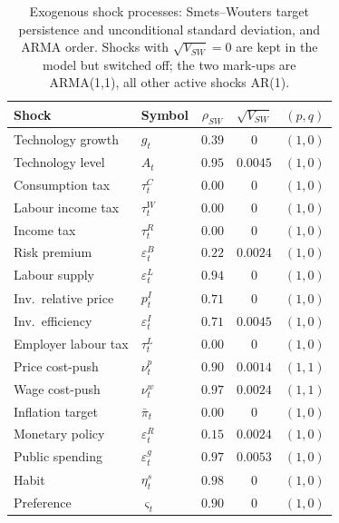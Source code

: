 \documentclass[11pt,a4paper]{article}
\newcommand{\bbar}[1]{\bar{#1}}
\begin{document}
\begin{table}[h]
\centering\small
\begin{tabular}{llccc}
\toprule
\textbf{Shock} & \textbf{Symbol} & $\rho_{SW}$ & $\sqrt{V_{SW}}$ & $(p,q)$ \\
\midrule
Technology growth    & $g_t$              & $0.39$ & $0$      & $(1,0)$ \\
Technology level     & $A_t$              & $0.95$ & $0.0045$ & $(1,0)$ \\
Consumption tax      & $\tau^C_t$         & $0.00$ & $0$      & $(1,0)$ \\
Labour income tax    & $\tau^W_t$         & $0.00$ & $0$      & $(1,0)$ \\
Income tax           & $\tau^R_t$         & $0.00$ & $0$      & $(1,0)$ \\
Risk premium         & $\varepsilon^B_t$  & $0.22$ & $0.0024$ & $(1,0)$ \\
Labour supply        & $\varepsilon^L_t$  & $0.94$ & $0$      & $(1,0)$ \\
Inv.\ relative price & $p^I_t$           & $0.71$ & $0$      & $(1,0)$ \\
Inv.\ efficiency     & $\varepsilon^I_t$  & $0.71$ & $0.0045$ & $(1,0)$ \\
Employer labour tax  & $\tau^L_t$         & $0.00$ & $0$      & $(1,0)$ \\
Price cost-push      & $\nu^p_t$          & $0.90$ & $0.0014$ & $(1,1)$ \\
Wage cost-push       & $\nu^w_t$          & $0.97$ & $0.0024$ & $(1,1)$ \\
Inflation target     & $\bbar\pi_t$       & $0.00$ & $0$      & $(1,0)$ \\
Monetary policy      & $\varepsilon^R_t$  & $0.15$ & $0.0024$ & $(1,0)$ \\
Public spending      & $\varepsilon^g_t$  & $0.97$ & $0.0053$ & $(1,0)$ \\
Habit                & $\eta^s_t$         & $0.98$ & $0$      & $(1,0)$ \\
Preference           & $\varsigma_t$      & $0.90$ & $0$      & $(1,0)$ \\
\bottomrule
\end{tabular}
\caption{Exogenous shock processes: Smets--Wouters target persistence and
unconditional standard deviation, and ARMA order. Shocks with $\sqrt{V_{SW}}=0$
are kept in the model but switched off; the two mark-ups are ARMA(1,1), all
other active shocks AR(1).}\label{tab:shocks}
\end{table}
\end{document}
